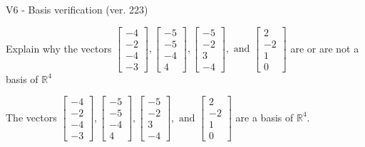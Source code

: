 \begin{exercise}
  \begin{exerciseTitle}V6 - Basis verification (ver. 223)\end{exerciseTitle}
  \begin{exerciseStatement}
    Explain why the vectors \(\left[\begin{array}{r}
-4 \\
-2 \\
-4 \\
-3
\end{array}\right] , \left[\begin{array}{r}
-5 \\
-5 \\
-4 \\
4
\end{array}\right] , \left[\begin{array}{r}
-5 \\
-2 \\
3 \\
-4
\end{array}\right] , \text{ and } \left[\begin{array}{r}
2 \\
-2 \\
1 \\
0
\end{array}\right]\) are or are not a basis of \(\mathbb{R}^4\)	


  \end{exerciseStatement}
  \begin{exerciseAnswer}
   The vectors \(\left[\begin{array}{r}
-4 \\
-2 \\
-4 \\
-3
\end{array}\right] , \left[\begin{array}{r}
-5 \\
-5 \\
-4 \\
4
\end{array}\right] , \left[\begin{array}{r}
-5 \\
-2 \\
3 \\
-4
\end{array}\right] , \text{ and } \left[\begin{array}{r}
2 \\
-2 \\
1 \\
0
\end{array}\right]\) 
  	 are  a basis of \(\mathbb{R}^4\).
  


  \end{exerciseAnswer}
\end{exercise}